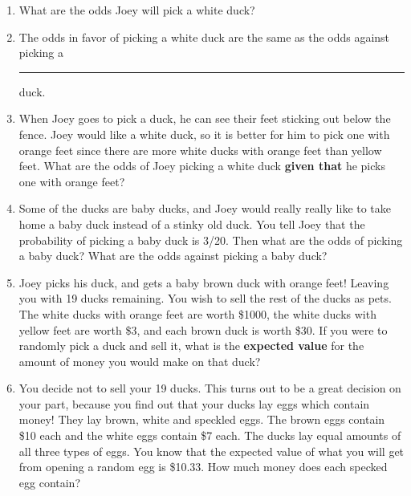 \documentclass{article}
\begin{document}
\begin{enumerate} 

\item What are the odds Joey will pick a white duck?

\vspace{1in}

\item The odds in favor of picking a white duck are the same as the odds against picking a \rule{1in}{0.01in} duck.

\vspace{0.1in}

\item When Joey goes to pick a duck, he can see their feet sticking out below the fence. Joey would like a white duck, so it is better for him to pick one with orange feet since there are more white ducks with orange feet than yellow feet. What are the odds of Joey picking a white duck \textbf{given that} he picks one with orange feet?

\vspace{1in}

\item Some of the ducks are baby ducks, and Joey would really really like to take home a baby duck instead of a stinky old duck. You tell Joey that the probability of picking a baby duck is 3/20. Then what are the odds of picking a baby duck? What are the odds against picking a baby duck?

\vspace{1in}

\item Joey picks his duck, and gets a baby brown duck with orange feet! Leaving you with 19 ducks remaining. You wish to sell the rest of the ducks as pets. The white ducks with orange feet are worth \$1000, the white ducks with yellow feet are worth \$3, and each brown duck is worth \$30. If you were to randomly pick a duck and sell it, what is the \textbf{expected value} for the amount of money you would make on that duck?

\newpage

\item You decide not to sell your 19 ducks. This turns out to be a great decision on your part, because you find out that your ducks lay eggs which contain money! They lay brown, white and speckled eggs. The brown eggs contain \$10 each and the white eggs contain \$7 each. The ducks lay equal amounts of all three types of eggs. You know that the expected value of what you will get from opening a random egg is \$10.33. How much money does each specked egg contain?


\end{enumerate}
\end{document}
